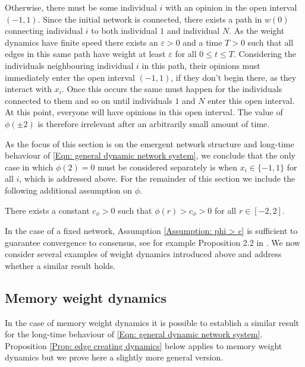 \documentclass{article}
\begin{document}
Otherwise, there must be some individual $i$ with an opinion in the open interval $(-1,1)$. Since the initial network is connected, there exists a path in $w(0)$ connecting individual $i$ to both individual $1$ and individual $N$. As the weight dynamics have finite speed there exists an $\varepsilon>0$ and a time $T>0$ such that all edges in this same path have weight at least $\varepsilon$ for all $0\leq t \leq T$. Considering the individuals neighbouring individual $i$ in this path, their opinions must immediately enter the open interval $(-1,1)$, if they don't begin there, as they interact with $x_i$. Once this occurs the same must happen for the individuals connected to them and so on until individuals $1$ and $N$ enter this open interval. At this point, everyone will have opinions in this open interval. The value of $\phi(\pm2)$ is therefore irrelevant after an arbitrarily small amount of time. 

As the focus of this section is on the emergent network structure and long-time behaviour of \eqref{Eqn: general dynamic network system}, we conclude that the only case in which $\phi(2)=0$ must be considered separately is when $x_i\in\{-1,1\}$ for all $i$, which is addressed above. For the remainder of this section we include the following additional assumption on $\phi$.  

\begin{assumption} \label{Assumption: phi > c}
    There exists a constant $c_\phi>0$ such that $\phi(r)>c_\phi>0$ for all $r\in[-2,2]$. 
\end{assumption}

In the case of a fixed network, Assumption \ref{Assumption: phi > c} is sufficient to guarantee convergence to consensus, see for example Proposition 2.2 in \cite{nugent2023evolving}. We now consider several examples of weight dynamics introduced above and address whether a similar result holds. 

\subsection{Memory weight dynamics}

In the case of memory weight dynamics it is possible to establish a similar result for the long-time behaviour of \eqref{Eqn: general dynamic network system}. Proposition \ref{Prop: edge creating dynamics} below applies to memory weight dynamics but we prove here a slightly more general version. 
\end{document}

